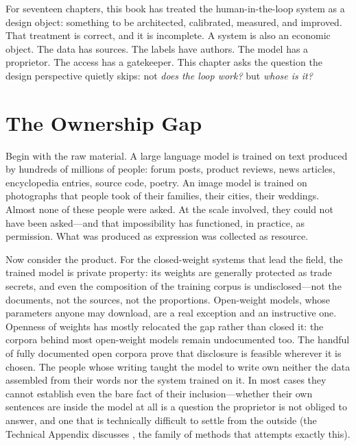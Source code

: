 For seventeen chapters, this book has treated the human-in-the-loop system as a design object: something to be architected, calibrated, measured, and improved. That treatment is correct, and it is incomplete. A \hitl system is also an economic object. The data has sources. The labels have authors. The model has a proprietor. The access has a gatekeeper. This chapter asks the question the design perspective quietly skips: not \emph{does the loop work?} but \emph{whose is it?}

\section{The Ownership Gap}
\label{sec:ch18-ownership-gap}

Begin with the raw material. A large language model is trained on text produced by hundreds of millions of people: forum posts, product reviews, news articles, encyclopedia entries, source code, poetry. An image model is trained on photographs that people took of their families, their cities, their weddings. Almost none of these people were asked. At the scale involved, they could not have been asked---and that impossibility has functioned, in practice, as permission. What was produced as expression was collected as resource.

Now consider the product. For the closed-weight systems that lead the field, the trained model is private property: its weights are generally protected as trade secrets, and even the composition of the training corpus is undisclosed---not the documents, not the sources, not the proportions. Open-weight models, whose parameters anyone may download, are a real exception and an instructive one. Openness of weights has mostly relocated the gap rather than closed it: the corpora behind most open-weight models remain undocumented too. The handful of fully documented open corpora prove that disclosure is feasible wherever it is chosen. The people whose writing taught the model to write own neither the data assembled from their words nor the system trained on it. In most cases they cannot establish even the bare fact of their inclusion---whether their own sentences are inside the model at all is a question the proprietor is not obliged to answer, and one that is technically difficult to settle from the outside (the Technical Appendix discusses , the family of methods that attempts exactly this).


